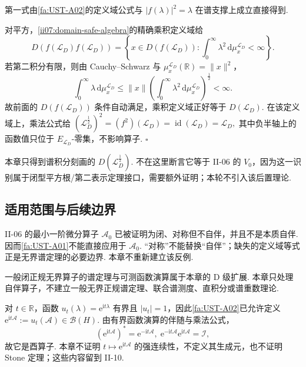 \begin{FAProof}
第一式由\autoref{fa:UST-A02}的定义域公式与 \(\displaystyle|f(\lambda)|^2=\lambda\) 在谱支撑上成立直接得到.

对平方，\autoref{ii07:domain-safe-algebra}的精确乘积定义域给
\[
D(f(\mathcal L_D)f(\mathcal L_D))
=
\left\{
 x\in D(f(\mathcal L_D)):
 \int_0^\infty\lambda^2\,\mathrm{d}\mu_x^{\mathcal L_D}<\infty
\right\}.
\]
若第二积分有限，则由 Cauchy--Schwarz 与 \(\displaystyle\mu_x^{\mathcal L_D}(\mathbb R)=\|x\|^2\)，
\[
\int_0^\infty\lambda\,\mathrm{d}\mu_x^{\mathcal L_D}
\leqslant
\|x\|
\left(
\int_0^\infty\lambda^2\,\mathrm{d}\mu_x^{\mathcal L_D}
\right)^{\frac{1}{2}}<\infty.
\]
故前面的 \(\displaystyle D(f(\mathcal L_D))\) 条件自动满足，乘积定义域正好等于 \(\displaystyle D(\mathcal L_D)\). 在该定义域上，乘法公式给
\(\displaystyle (\mathcal L_D^{\frac{1}{2}})^2 =(f^2)(\mathcal L_D) =\operatorname{id}(\mathcal L_D) =\mathcal L_D,\)
其中负半轴上的函数值只位于 \(\displaystyle E_{\mathcal L_D}\)-零集，不影响算子.
\hfill\(\square\)
\end{FAProof}

\begin{FARemark}[平方根定义域与闭型定义域的边界]
本章只得到谱积分刻画的 \(\displaystyle D(\mathcal L_D^{\frac{1}{2}})\). 不在这里断言它等于 II-06 的 \(\displaystyle V_0\)，因为这一识别属于闭型平方根/第二表示定理接口，需要额外证明；本轮不引入该后置理论.
\end{FARemark}

\subsection{适用范围与后续边界}

\begin{FACounterexample}[对称但非自伴的反例的适用性边界]
II-06 的最小一阶微分算子 \(\displaystyle\mathcal A_0\) 已被证明为闭、对称但不自伴，并且不是本质自伴. 因而\autoref{fa:UST-A01}不能直接应用于 \(\displaystyle\mathcal A_0\). “对称”不能替换“自伴”；缺失的定义域等式正是无界谱定理的必要边界. 本章不重新建立该反例.
\end{FACounterexample}

\begin{FARemark}[一般无界正规算子]
一般闭正规无界算子的谱定理与可测函数演算属于本章的 D 级扩展. 本章只处理自伴算子，不建立一般无界正规谱定理、联合谱测度、直积分或谱重数理论.
\end{FARemark}

\begin{FAApplication}
对 \(\displaystyle t\in\mathbb R\)，函数 \(\displaystyle u_t(\lambda)=\mathrm{e}^{\mathrm{i}t\lambda}\) 有界且 \(\displaystyle|u_t|=1\)，因此\autoref{fa:UST-A02}已允许定义
\(\displaystyle \mathrm{e}^{\mathrm{i}t\mathcal A}:=u_t(\mathcal A)\in\mathcal B(H).\)
由有界函数演算的伴随与乘法公式，
\[
(\mathrm{e}^{\mathrm{i}t\mathcal A})^*
=
\mathrm{e}^{-\mathrm{i}t\mathcal A},
\;
\mathrm{e}^{-\mathrm{i}t\mathcal A}\mathrm{e}^{\mathrm{i}t\mathcal A}
=
\mathcal I,
\]
故它是酉算子. 本章不证明 \(\displaystyle t\mapsto\mathrm{e}^{\mathrm{i}t\mathcal A}\) 的强连续性，不定义其生成元，也不证明 Stone 定理；这些内容留到 II-10.
\end{FAApplication}

